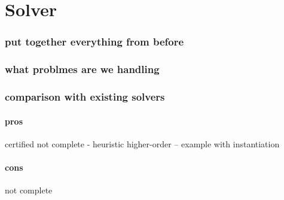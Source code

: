\chapter{Solver}

\subsection{put together everything from before}

\subsection{what problmes are we handling}

\subsection{comparison with existing solvers}

\subsubsection{pros}

certified
not complete - heuristic
higher-order -- example with instantiation
\subsubsection{cons}

not complete
